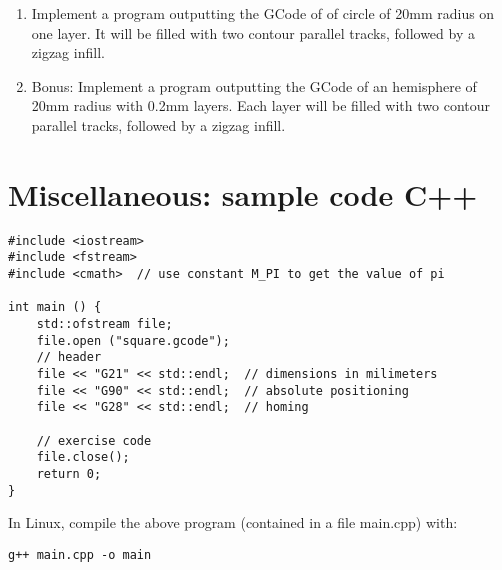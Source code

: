 \documentclass{article}
\begin{document}
\begin{enumerate}
\item Implement a program outputting the GCode of of circle of 20mm radius on one layer. It will be filled with two contour parallel tracks, followed by a zigzag infill.
\item Bonus: Implement a program outputting the GCode of an hemisphere of 20mm radius with 0.2mm layers. Each layer will be filled with two contour parallel tracks, followed by a zigzag infill.
\end{enumerate}


\section{Miscellaneous: sample code C++}

\begin{verbatim}
#include <iostream>
#include <fstream>
#include <cmath>  // use constant M_PI to get the value of pi

int main () {
    std::ofstream file;
    file.open ("square.gcode");
    // header
    file << "G21" << std::endl;  // dimensions in milimeters
    file << "G90" << std::endl;  // absolute positioning
    file << "G28" << std::endl;  // homing

    // exercise code
    file.close();
    return 0;
}

\end{verbatim}

In Linux, compile the above program (contained in a file main.cpp) with:

\begin{verbatim}
g++ main.cpp -o main
\end{verbatim}
\end{document}
